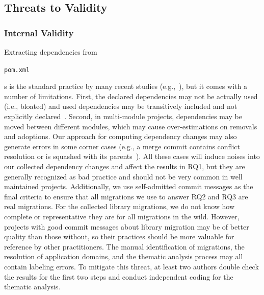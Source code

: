 \documentclass[sigconf, screen]{acmart}
\newcommand{\Code}[1]{\begin{small}\texttt{#1}\end{small}}
\begin{document}
\subsection{Threats to Validity}
\label{sec:threat-to-validity}

\subsubsection{Internal Validity}
Extracting dependencies from \Code{pom.xml}s is the standard practice by many recent studies (e.g.,~\cite{cox2015measuring, dietrich2019dependency, kula2018developers, wang2020empirical}), but it comes with a number of limitations.
First, the declared dependencies may not be actually used (i.e., bloated) and used dependencies may be transitively included and not explicitly declared~\cite{soto2021comprehensive}. %
Second, in multi-module projects, dependencies may be moved between different modules, which may cause over-estimations on removals and adoptions.
Our approach for computing dependency changes may also generate errors in some corner cases (e.g., a merge commit contains conflict resolution or is squashed with its parents~\cite{GitSquashMerge}).
All these cases will induce noises into our collected dependency changes and affect the results in RQ1, but they are generally recognized as bad practice and should not be very common in well maintained projects.
Additionally, we use self-admitted commit messages as the final criteria to ensure that all migrations we use to answer RQ2 and RQ3 are real migrations.
For the collected library migrations, we do not know how complete or representative they are for all migrations in the wild.
However, projects with good commit messages about library migration may be of better quality than those without, so their practices should be more valuable for reference by other practitioners.
The manual identification of migrations, the resolution of application domains, and the thematic analysis process may all contain labeling errors.
To mitigate this threat, at least two authors double check the results for the first two steps and conduct independent coding for the thematic analysis.
\end{document}
